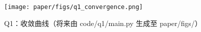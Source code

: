 \begin{figure}[htbp]\centering
  \texttt{[image: paper/figs/q1\_convergence.png]}
  \caption{Q1：收敛曲线（将来由 code/q1/main.py 生成至 paper/figs/）}
\end{figure}
